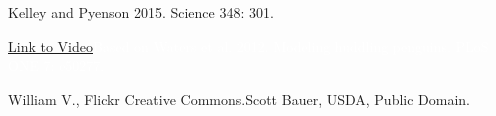 \documentclass[t]{beamer}
\begin{document}
{
\begin{frame}[b]
\hfill \tiny Kelley and Pyenson 2015. Science 348: 301.
\end{frame}
}

{
\begin{frame}[b]
\end{frame}
}

{
\begin{frame}[b]
\end{frame}
}

{
\begin{frame}[b]
\Tiny\textcolor{white}{\href{http://www.youtube.com/watch?v=Cdiapvktzkw}{Link to Video}\hfill\tiny Based on Waters et al. 2012. Modeling huddling penguins. PLoS ONE 7: e50277.}
\end{frame}
}

{
\begin{frame}[b]
\tiny William V., Flickr Creative Commons.\hfill Scott Bauer, USDA, Public Domain.
\end{frame}
}
\end{document}
